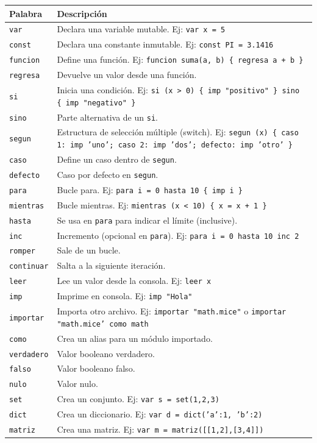 \documentclass[12pt]{article}
\begin{document}
\begin{center}
\begin{tabular}{|l|p{10cm}|}
\hline
\textbf{Palabra} & \textbf{Descripción} \\
\hline
\texttt{var} & Declara una variable mutable. Ej: \texttt{var x = 5} \\
\hline
\texttt{const} & Declara una constante inmutable. Ej: \texttt{const PI = 3.1416} \\
\hline
\texttt{funcion} & Define una función. Ej: \texttt{funcion suma(a, b) \{ regresa a + b \}} \\
\hline
\texttt{regresa} & Devuelve un valor desde una función. \\
\hline
\texttt{si} & Inicia una condición. Ej: \texttt{si (x > 0) \{ imp "positivo" \} sino \{ imp "negativo" \}} \\
\hline
\texttt{sino} & Parte alternativa de un \texttt{si}. \\
\hline
\texttt{segun} & Estructura de selección múltiple (switch). Ej: \texttt{segun (x) \{ caso 1: imp 'uno'; caso 2: imp 'dos'; defecto: imp 'otro' \}} \\
\hline
\texttt{caso} & Define un caso dentro de \texttt{segun}. \\
\hline
\texttt{defecto} & Caso por defecto en \texttt{segun}. \\
\hline
\texttt{para} & Bucle para. Ej: \texttt{para i = 0 hasta 10 \{ imp i \}} \\
\hline
\texttt{mientras} & Bucle mientras. Ej: \texttt{mientras (x < 10) \{ x = x + 1 \}} \\
\hline
\texttt{hasta} & Se usa en \texttt{para} para indicar el límite (inclusive). \\
\hline
\texttt{inc} & Incremento (opcional en \texttt{para}). Ej: \texttt{para i = 0 hasta 10 inc 2} \\
\hline
\texttt{romper} & Sale de un bucle. \\
\hline
\texttt{continuar} & Salta a la siguiente iteración. \\
\hline
\texttt{leer} & Lee un valor desde la consola. Ej: \texttt{leer x} \\
\hline
\texttt{imp} & Imprime en consola. Ej: \texttt{imp "Hola"} \\
\hline
\texttt{importar} & Importa otro archivo. Ej: \texttt{importar "math.mice"} o \texttt{importar "math.mice' como math} \\
\hline
\texttt{como} & Crea un alias para un módulo importado. \\
\hline
\texttt{verdadero} & Valor booleano verdadero. \\
\hline
\texttt{falso} & Valor booleano falso. \\
\hline
\texttt{nulo} & Valor nulo. \\
\hline
\texttt{set} & Crea un conjunto. Ej: \texttt{var s = set(1,2,3)} \\
\hline
\texttt{dict} & Crea un diccionario. Ej: \texttt{var d = dict('a':1, 'b':2)} \\
\hline
\texttt{matriz} & Crea una matriz. Ej: \texttt{var m = matriz([[1,2],[3,4]])} \\
\hline
\end{tabular}
\end{center}
\end{document}
